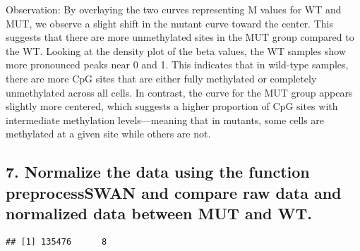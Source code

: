 \documentclass[
]{article}
\newenvironment{Shaded}{\begin{snugshade}}{\end{snugshade}}
\newcommand{\CommentTok}[1]{\textcolor[rgb]{0.56,0.35,0.01}{\textit{#1}}}
\newcommand{\FunctionTok}[1]{\textcolor[rgb]{0.13,0.29,0.53}{\textbf{#1}}}
\newcommand{\NormalTok}[1]{#1}
\newcommand{\OtherTok}[1]{\textcolor[rgb]{0.56,0.35,0.01}{#1}}
\newcommand{\SpecialCharTok}[1]{\textcolor[rgb]{0.81,0.36,0.00}{\textbf{#1}}}
\newcommand{\StringTok}[1]{\textcolor[rgb]{0.31,0.60,0.02}{#1}}
\begin{document}
Observation: By overlaying the two curves representing M values for WT
and MUT, we observe a slight shift in the mutant curve toward the
center. This suggests that there are more unmethylated sites in the MUT
group compared to the WT. Looking at the density plot of the beta
values, the WT samples show more pronounced peaks near 0 and 1. This
indicates that in wild-type samples, there are more CpG sites that are
either fully methylated or completely unmethylated across all cells. In
contrast, the curve for the MUT group appears slightly more centered,
which suggests a higher proportion of CpG sites with intermediate
methylation levels---meaning that in mutants, some cells are methylated
at a given site while others are not.

\subsection{7. Normalize the data using the function preprocessSWAN and
compare raw data and normalized data between MUT and
WT.}\label{normalize-the-data-using-the-function-preprocessswan-and-compare-raw-data-and-normalized-data-between-mut-and-wt.}

\begin{Shaded}
\end{Shaded}

\begin{verbatim}
## [1] 135476      8
\end{verbatim}
\end{document}

